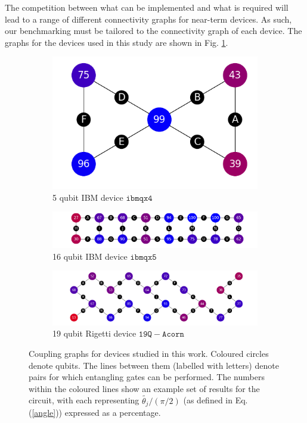 \documentclass[aps,prl,twocolumn,showpacs,preprintnumbers]{revtex4-1}
\begin{document}
The competition between what can be implemented and what is required will lead to a range of different connectivity graphs for near-term devices. As such, our benchmarking must be tailored to the connectivity graph of each device. The graphs for the devices used in this study are shown in Fig. \ref{fig:graphs}.

\begin{figure}
    \centering
    \begin{subfigure}[b]{0.5\columnwidth}
        \includegraphics[width=\textwidth]{figures/ibmqx4.png}
        \caption{5 qubit IBM device $\mathtt{ibmqx4}$}
    \end{subfigure}
    \begin{subfigure}[b]{\columnwidth}
        \includegraphics[width=\textwidth]{figures/ibmqx5.png}
        \caption{16 qubit IBM device $\mathtt{ibmqx5}$}
    \end{subfigure}
    \begin{subfigure}[b]{\columnwidth}
        \includegraphics[width=\textwidth]{figures/acorn.png}
        \caption{19 qubit Rigetti device $\mathtt{19Q-Acorn}$}
    \end{subfigure}
    \caption{Coupling graphs for devices studied in this work. Coloured circles denote qubits. The lines between them (labelled with letters) denote pairs for which entangling gates can be performed. The numbers within the coloured lines show an example set of results for the circuit, with each representing $\tilde{\theta_j} / (\pi/2)$ (as defined in Eq. (\ref{angle})) expressed as a percentage.}\label{fig:graphs}
\end{figure}
\end{document}
